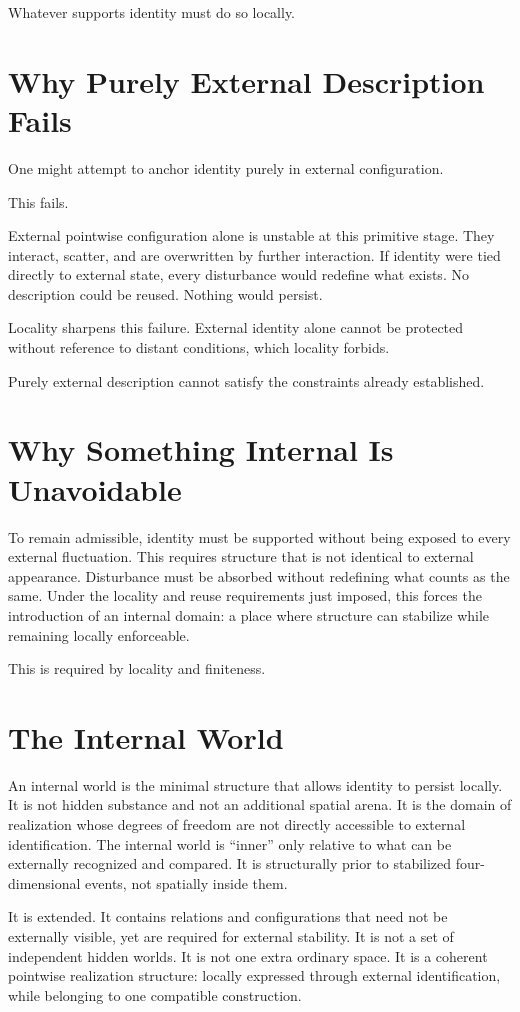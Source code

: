 \documentclass[11pt,twoside,openright]{book}
\begin{document}
Whatever supports identity
must do so locally.
\section*{Why Purely External Description Fails}

One might attempt to anchor identity purely in external configuration.

This fails.

External pointwise configuration alone is unstable at this primitive stage. They interact, scatter, and are overwritten by further interaction. If identity were tied directly to external state, every disturbance would redefine what exists. No description could be reused. Nothing would persist.

Locality sharpens this failure. External identity alone cannot be protected without reference to distant conditions, which locality forbids.

Purely external description
cannot satisfy the constraints
already established.
\section*{Why Something Internal Is Unavoidable}

To remain admissible, identity must be supported without being exposed to every external fluctuation. This requires structure that is not identical to external appearance. Disturbance must be absorbed without redefining what counts as the same. Under the locality and reuse requirements just imposed, this forces the introduction of an internal domain: a place where structure can stabilize while remaining locally enforceable.

This is required
by locality and finiteness.
\section*{The Internal World}

An internal world is the minimal structure that allows identity to persist locally. It is not hidden substance and not an additional spatial arena. It is the domain of realization whose degrees of freedom are not directly accessible to external identification. The internal world is ``inner'' only relative to what can be externally recognized and compared. It is structurally prior to stabilized four-dimensional events, not spatially inside them.

It is extended. It contains relations and configurations that need not be externally visible, yet are required for external stability. It is not a set of independent hidden worlds. It is not one extra ordinary space. It is a coherent pointwise realization structure: locally expressed through external identification, while belonging to one compatible construction.
\end{document}
